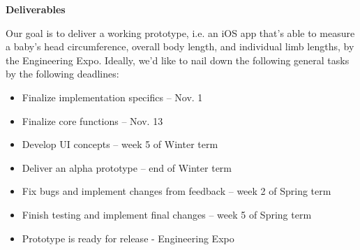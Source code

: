 \documentclass[10pt, draftclsnofoot, letterpaper, margin=.75in, onecolumn]{IEEEtran}
\begin{document}
\textbf{Deliverables}
\par \noindent Our goal is to deliver a working prototype, i.e. an iOS app that's able to measure a baby's head circumference, overall body length, and individual limb lengths, by the Engineering Expo. Ideally, we'd like to nail down the following general tasks by the following deadlines:
\begin{itemize}
    \item Finalize implementation specifics -- Nov. 1
    \item Finalize core functions -- Nov. 13
    \item Develop UI concepts -- week 5 of Winter term
    \item Deliver an alpha prototype -- end of Winter term
    \item Fix bugs and implement changes from feedback -- week 2 of Spring term
    \item Finish testing and implement final changes -- week 5 of Spring term
    \item Prototype is ready for release - Engineering Expo
\end{itemize}



\end{document}

